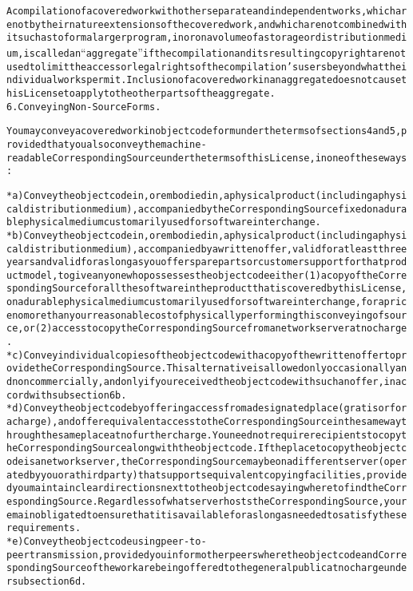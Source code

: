 \begin{alltt}
A compilation of a covered work with other separate and independent works, which are not by their nature extensions of the covered work, and which are not combined with it such as to form a larger program, in or on a volume of a storage or distribution medium, is called an “aggregate” if the compilation and its resulting copyright are not used to limit the access or legal rights of the compilation's users beyond what the individual works permit. Inclusion of a covered work in an aggregate does not cause this License to apply to the other parts of the aggregate.
6. Conveying Non-Source Forms.

You may convey a covered work in object code form under the terms of sections 4 and 5, provided that you also convey the machine-readable Corresponding Source under the terms of this License, in one of these ways:

    * a) Convey the object code in, or embodied in, a physical product (including a physical distribution medium), accompanied by the Corresponding Source fixed on a durable physical medium customarily used for software interchange.
    * b) Convey the object code in, or embodied in, a physical product (including a physical distribution medium), accompanied by a written offer, valid for at least three years and valid for as long as you offer spare parts or customer support for that product model, to give anyone who possesses the object code either (1) a copy of the Corresponding Source for all the software in the product that is covered by this License, on a durable physical medium customarily used for software interchange, for a price no more than your reasonable cost of physically performing this conveying of source, or (2) access to copy the Corresponding Source from a network server at no charge.
    * c) Convey individual copies of the object code with a copy of the written offer to provide the Corresponding Source. This alternative is allowed only occasionally and noncommercially, and only if you received the object code with such an offer, in accord with subsection 6b.
    * d) Convey the object code by offering access from a designated place (gratis or for a charge), and offer equivalent access to the Corresponding Source in the same way through the same place at no further charge. You need not require recipients to copy the Corresponding Source along with the object code. If the place to copy the object code is a network server, the Corresponding Source may be on a different server (operated by you or a third party) that supports equivalent copying facilities, provided you maintain clear directions next to the object code saying where to find the Corresponding Source. Regardless of what server hosts the Corresponding Source, you remain obligated to ensure that it is available for as long as needed to satisfy these requirements.
    * e) Convey the object code using peer-to-peer transmission, provided you inform other peers where the object code and Corresponding Source of the work are being offered to the general public at no charge under subsection 6d.


\end{alltt}
